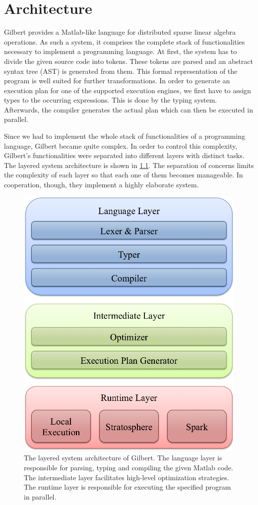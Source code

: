 \chapter{Architecture}
\label{cha:architecture}


Gilbert provides a Matlab-like language for distributed sparse linear algebra operations.
As such a system, it comprises the complete stack of functionalities necessary to implement a programming language.
At first, the system has to divide the given source code into tokens.
These tokens are parsed and an abstract syntax tree (AST) is generated from them.
This formal representation of the program is well suited for further transformations.
In order to generate an execution plan for one of the supported execution engines, we first have to assign types to the occurring expressions.
This is done by the typing system.
Afterwards, the compiler generates the actual plan which can then be executed in parallel.

Since we had to implement the whole stack of functionalities of a programming language, Gilbert became quite complex.
In order to control this complexity, Gilbert's functionalities were separated into different layers with distinct tasks.
The layered system architecture is shown in \cref{fig:systemArchitecture}.
The separation of concerns limits the complexity of each layer so that each one of them becomes manageable.
In cooperation, though, they implement a highly elaborate system.

\begin{figure}
	\centering
	\includegraphics[width=0.5\linewidth]{images/systemArchitecture.png}
	\caption{The layered system architecture of Gilbert. The language layer is responsible for parsing, typing and compiling the given Matlab code. The intermediate layer facilitates high-level optimization strategies. The runtime layer is responsible for executing the specified program in parallel.}
	\label{fig:systemArchitecture}
\end{figure}

